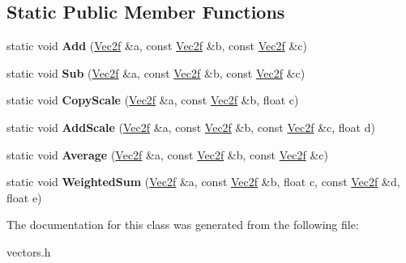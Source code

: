 \subsection*{\-Static \-Public \-Member \-Functions}
\begin{DoxyCompactItemize}
\item 
\hypertarget{classVec2f_aaa72e50ede2f02d9cbfead98966a6a10}{static void {\bfseries \-Add} (\hyperlink{classVec2f}{\-Vec2f} \&a, const \hyperlink{classVec2f}{\-Vec2f} \&b, const \hyperlink{classVec2f}{\-Vec2f} \&c)}\label{classVec2f_aaa72e50ede2f02d9cbfead98966a6a10}

\item 
\hypertarget{classVec2f_aa3efb59c19587d81ec7ad53ecf12226d}{static void {\bfseries \-Sub} (\hyperlink{classVec2f}{\-Vec2f} \&a, const \hyperlink{classVec2f}{\-Vec2f} \&b, const \hyperlink{classVec2f}{\-Vec2f} \&c)}\label{classVec2f_aa3efb59c19587d81ec7ad53ecf12226d}

\item 
\hypertarget{classVec2f_a32c4b20a2c2b5fae581a4eeae4316c47}{static void {\bfseries \-Copy\-Scale} (\hyperlink{classVec2f}{\-Vec2f} \&a, const \hyperlink{classVec2f}{\-Vec2f} \&b, float c)}\label{classVec2f_a32c4b20a2c2b5fae581a4eeae4316c47}

\item 
\hypertarget{classVec2f_a80a502fea4f66b921c84019829128ff1}{static void {\bfseries \-Add\-Scale} (\hyperlink{classVec2f}{\-Vec2f} \&a, const \hyperlink{classVec2f}{\-Vec2f} \&b, const \hyperlink{classVec2f}{\-Vec2f} \&c, float d)}\label{classVec2f_a80a502fea4f66b921c84019829128ff1}

\item 
\hypertarget{classVec2f_ab8bb3386b3363f60cf814fb289528c16}{static void {\bfseries \-Average} (\hyperlink{classVec2f}{\-Vec2f} \&a, const \hyperlink{classVec2f}{\-Vec2f} \&b, const \hyperlink{classVec2f}{\-Vec2f} \&c)}\label{classVec2f_ab8bb3386b3363f60cf814fb289528c16}

\item 
\hypertarget{classVec2f_aec7c624674de97ca3cdf2a895d0c1495}{static void {\bfseries \-Weighted\-Sum} (\hyperlink{classVec2f}{\-Vec2f} \&a, const \hyperlink{classVec2f}{\-Vec2f} \&b, float c, const \hyperlink{classVec2f}{\-Vec2f} \&d, float e)}\label{classVec2f_aec7c624674de97ca3cdf2a895d0c1495}

\end{DoxyCompactItemize}


\-The documentation for this class was generated from the following file\-:\begin{DoxyCompactItemize}
\item 
vectors.\-h\end{DoxyCompactItemize}
